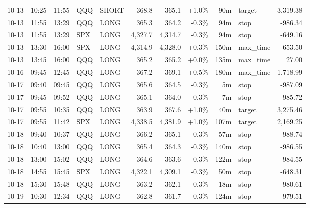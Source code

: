 \documentclass[11pt,a4paper,twoside]{article}
\begin{document}
\begin{center}
\begin{longtable}{>{\color{txtmain}}l l l l l r r r r >{\color{txtmain}}l r}
10-13 & 10:25 & 11:55 & QQQ & SHORT & 368.8 & 365.1 & \textcolor{wingreen}{+1.0\%} & 90m & target & \textcolor{wingreen}{3,319.38} \\
10-13 & 11:55 & 13:29 & QQQ & LONG & 365.3 & 364.2 & \textcolor{lossred}{-0.3\%} & 94m & stop & \textcolor{lossred}{-986.34} \\
10-13 & 11:55 & 13:29 & SPX & LONG & 4,327.7 & 4,314.7 & \textcolor{lossred}{-0.3\%} & 94m & stop & \textcolor{lossred}{-649.16} \\
10-13 & 13:30 & 16:00 & SPX & LONG & 4,314.9 & 4,328.0 & \textcolor{wingreen}{+0.3\%} & 150m & max\_time & \textcolor{wingreen}{653.50} \\
10-13 & 13:45 & 16:00 & QQQ & LONG & 365.2 & 365.2 & \textcolor{wingreen}{+0.0\%} & 135m & max\_time & \textcolor{wingreen}{27.00} \\
10-16 & 09:45 & 12:45 & QQQ & LONG & 367.2 & 369.1 & \textcolor{wingreen}{+0.5\%} & 180m & max\_time & \textcolor{wingreen}{1,718.99} \\
10-17 & 09:40 & 09:45 & QQQ & LONG & 365.6 & 364.5 & \textcolor{lossred}{-0.3\%} & 5m & stop & \textcolor{lossred}{-987.09} \\
10-17 & 09:45 & 09:52 & QQQ & LONG & 365.1 & 364.0 & \textcolor{lossred}{-0.3\%} & 7m & stop & \textcolor{lossred}{-985.72} \\
10-17 & 09:55 & 10:35 & QQQ & LONG & 363.9 & 367.6 & \textcolor{wingreen}{+1.0\%} & 40m & target & \textcolor{wingreen}{3,275.46} \\
10-17 & 09:55 & 11:42 & SPX & LONG & 4,338.5 & 4,381.9 & \textcolor{wingreen}{+1.0\%} & 107m & target & \textcolor{wingreen}{2,169.25} \\
10-18 & 09:40 & 10:37 & QQQ & LONG & 366.2 & 365.1 & \textcolor{lossred}{-0.3\%} & 57m & stop & \textcolor{lossred}{-988.74} \\
10-18 & 10:40 & 13:00 & QQQ & LONG & 365.4 & 364.3 & \textcolor{lossred}{-0.3\%} & 140m & stop & \textcolor{lossred}{-986.55} \\
10-18 & 13:00 & 15:02 & QQQ & LONG & 364.6 & 363.6 & \textcolor{lossred}{-0.3\%} & 122m & stop & \textcolor{lossred}{-984.55} \\
10-18 & 14:55 & 15:45 & SPX & LONG & 4,322.1 & 4,309.1 & \textcolor{lossred}{-0.3\%} & 50m & stop & \textcolor{lossred}{-648.31} \\
10-18 & 15:30 & 15:48 & QQQ & LONG & 363.2 & 362.1 & \textcolor{lossred}{-0.3\%} & 18m & stop & \textcolor{lossred}{-980.61} \\
10-19 & 10:30 & 12:34 & QQQ & LONG & 362.8 & 361.7 & \textcolor{lossred}{-0.3\%} & 124m & stop & \textcolor{lossred}{-979.51} \\

\end{longtable}
\end{center}
\end{document}
